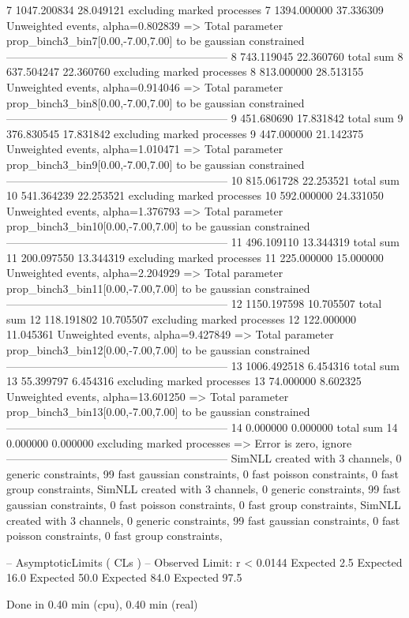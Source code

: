 7          1047.200834     28.049121       excluding marked processes    
7          1394.000000     37.336309       Unweighted events, alpha=0.802839
  => Total parameter prop_binch3_bin7[0.00,-7.00,7.00] to be gaussian constrained
------------------------------------------------------------
8          743.119045      22.360760       total sum                     
8          637.504247      22.360760       excluding marked processes    
8          813.000000      28.513155       Unweighted events, alpha=0.914046
  => Total parameter prop_binch3_bin8[0.00,-7.00,7.00] to be gaussian constrained
------------------------------------------------------------
9          451.680690      17.831842       total sum                     
9          376.830545      17.831842       excluding marked processes    
9          447.000000      21.142375       Unweighted events, alpha=1.010471
  => Total parameter prop_binch3_bin9[0.00,-7.00,7.00] to be gaussian constrained
------------------------------------------------------------
10         815.061728      22.253521       total sum                     
10         541.364239      22.253521       excluding marked processes    
10         592.000000      24.331050       Unweighted events, alpha=1.376793
  => Total parameter prop_binch3_bin10[0.00,-7.00,7.00] to be gaussian constrained
------------------------------------------------------------
11         496.109110      13.344319       total sum                     
11         200.097550      13.344319       excluding marked processes    
11         225.000000      15.000000       Unweighted events, alpha=2.204929
  => Total parameter prop_binch3_bin11[0.00,-7.00,7.00] to be gaussian constrained
------------------------------------------------------------
12         1150.197598     10.705507       total sum                     
12         118.191802      10.705507       excluding marked processes    
12         122.000000      11.045361       Unweighted events, alpha=9.427849
  => Total parameter prop_binch3_bin12[0.00,-7.00,7.00] to be gaussian constrained
------------------------------------------------------------
13         1006.492518     6.454316        total sum                     
13         55.399797       6.454316        excluding marked processes    
13         74.000000       8.602325        Unweighted events, alpha=13.601250
  => Total parameter prop_binch3_bin13[0.00,-7.00,7.00] to be gaussian constrained
------------------------------------------------------------
14         0.000000        0.000000        total sum                     
14         0.000000        0.000000        excluding marked processes    
  => Error is zero, ignore      
------------------------------------------------------------
SimNLL created with 3 channels, 0 generic constraints, 99 fast gaussian constraints, 0 fast poisson constraints, 0 fast group constraints, 
SimNLL created with 3 channels, 0 generic constraints, 99 fast gaussian constraints, 0 fast poisson constraints, 0 fast group constraints, 
SimNLL created with 3 channels, 0 generic constraints, 99 fast gaussian constraints, 0 fast poisson constraints, 0 fast group constraints, 

 -- AsymptoticLimits ( CLs ) --
Observed Limit: r < 0.0144
Expected  2.5%
Expected 16.0%
Expected 50.0%
Expected 84.0%
Expected 97.5%

Done in 0.40 min (cpu), 0.40 min (real)
